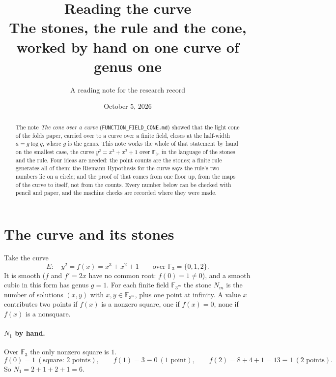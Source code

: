 \documentclass[11pt]{article}
\title{Reading the curve\\\large The stones, the rule and the cone, worked by hand on one curve of genus one}
\date{October 5, 2026}
\author{A reading note for the research record}
\newcommand{\F}{\mathbb F}
\begin{document}
\maketitle

\begin{abstract}
\noindent The note \emph{The cone over a curve} (\texttt{FUNCTION\_FIELD\_CONE.md}) showed that the light cone of the folds paper, carried over to a curve over a finite field, closes at the half-width $a=g\log q$, where $g$ is the genus. This note works the whole of that statement by hand on the smallest case, the curve $y^2=x^3+x^2+1$ over $\F_3$, in the language of the stones and the rule. Four ideas are needed: the point counts are the stones; a finite rule generates all of them; the Riemann Hypothesis for the curve says the rule's two numbers lie on a circle; and the proof of that comes from one floor up, from the maps of the curve to itself, not from the counts. Every number below can be checked with pencil and paper, and the machine checks are recorded where they were made.
\end{abstract}

\section{The curve and its stones}

Take the curve
\[
E:\quad y^2=f(x)=x^3+x^2+1\qquad\text{over }\F_3=\{0,1,2\}.
\]
It is smooth ($f$ and $f'=2x$ have no common root: $f(0)=1\neq0$), and a smooth cubic in this form has genus $g=1$. For each finite field $\F_{3^m}$ the stone $N_m$ is the number of solutions $(x,y)$ with $x,y\in\F_{3^m}$, plus one point at infinity. A value $x$ contributes two points if $f(x)$ is a nonzero square, one if $f(x)=0$, none if $f(x)$ is a nonsquare.

\paragraph{$N_1$ by hand.} Over $\F_3$ the only nonzero square is $1$.
\[
f(0)=1\ (\text{square: 2 points}),\qquad f(1)=3\equiv0\ (\text{1 point}),\qquad f(2)=8+4+1=13\equiv1\ (\text{2 points}).
\]
So $N_1=2+1+2+1=6$.
\end{document}
